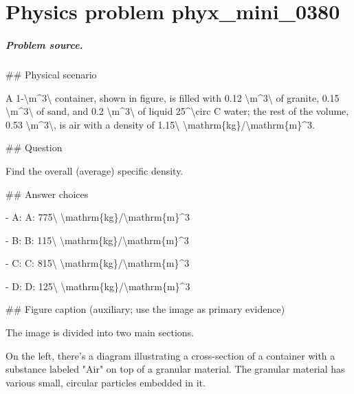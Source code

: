 
\chapter{Physics problem phyx\_mini\_0380}
\label{ch:PhyXMiniProblems_problem_phyx_mini_0380}

\paragraph{Problem source.}
\#\# Physical scenario

A 1-\textbackslash{}m\textasciicircum{}3\textbackslash{} container, shown in figure, is filled with 0.12 \textbackslash{}m\textasciicircum{}3\textbackslash{} of granite, 0.15 \textbackslash{}m\textasciicircum{}3\textbackslash{} of sand, and 0.2 \textbackslash{}m\textasciicircum{}3\textbackslash{} of liquid 25\textasciicircum{}\textbackslash{}circ C water; the rest of the volume, 0.53 \textbackslash{}m\textasciicircum{}3\textbackslash{}, is air with a density of 1.15\textbackslash{} \textbackslash{}mathrm\{kg\}/\textbackslash{}mathrm\{m\}\textasciicircum{}3.

\#\# Question

Find the overall (average) specific density.

\#\# Answer choices

- A: A: 775\textbackslash{} \textbackslash{}mathrm\{kg\}/\textbackslash{}mathrm\{m\}\textasciicircum{}3

- B: B: 115\textbackslash{} \textbackslash{}mathrm\{kg\}/\textbackslash{}mathrm\{m\}\textasciicircum{}3

- C: C: 815\textbackslash{} \textbackslash{}mathrm\{kg\}/\textbackslash{}mathrm\{m\}\textasciicircum{}3

- D: D: 125\textbackslash{} \textbackslash{}mathrm\{kg\}/\textbackslash{}mathrm\{m\}\textasciicircum{}3

\#\# Figure caption (auxiliary; use the image as primary evidence)

The image is divided into two main sections.

On the left, there's a diagram illustrating a cross-section of a container with a substance labeled "Air" on top of a granular material. The granular material has various small, circular particles embedded in it.

